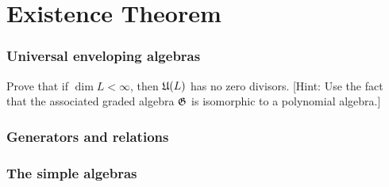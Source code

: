 \part{Existence Theorem}
\section{Universal enveloping algebras}

\begin{ex}
  Prove that if $\dim L < \infty$, then $\mathfrak{U}(L)$ has no zero divisors. [Hint: Use the fact that the associated graded algebra $\mathfrak{G}$ is isomorphic to a polynomial algebra.]
\end{ex}

\section{Generators and relations}

\section{The simple algebras}
